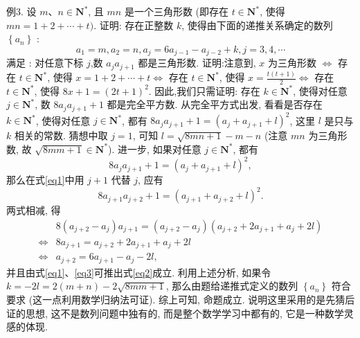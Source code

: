 例3. 设 $m 、 n \in \mathbf{N}^*$, 且 $m n$ 是一个三角形数 (即存在 $t \in \mathbf{N}^*$, 使得 $m n= 1+2+\cdots+t)$. 证明: 存在正整数 $k$, 使得由下面的递推关系确定的数列 $\left\{a_n\right\}$ :
$$
a_1=m, a_2=n, a_j=6 a_{j-1}-a_{j-2}+k, j=3,4, \cdots
$$
满足 : 对任意下标 $j$,数 $a_j a_{j+1}$ 都是三角形数.
证明:注意到,
$x$ 为三角形数 $\Leftrightarrow$ 存在 $t \in \mathbf{N}^*$, 使得 $x=1+2+\cdots+t\Leftrightarrow$ 存在 $t \in \mathbf{N}^*$, 使得 $x=\frac{t(t+1)}{2}\Leftrightarrow$ 存在 $t \in \mathbf{N}^*$, 使得 $8 x+1=(2 t+1)^2$.
因此,我们只需证明: 存在 $k \in \mathbf{N}^*$, 使得对任意 $j \in \mathbf{N}^*$, 数 $8 a_j a_{j+1}+1$ 都是完全平方数.
从完全平方式出发, 看看是否存在 $k \in \mathbf{N}^*$, 使得对任意 $j \in \mathbf{N}^*$, 都有 $8 a_j a_{j+1}+1=\left(a_j+a_{j+1}+l\right)^2$, 这里 $l$ 是只与 $k$ 相关的常数.
猜想中取 $j=1$, 可知 $l=\sqrt{8 m n+1}-m-n$ (注意 $m n$ 为三角形数, 故 $\sqrt{8 m m+1} \in \mathbf{N}^*$).
进一步, 如果对任意 $j \in \mathbf{N}^*$, 都有
$$
8 a_j a_{j+1}+1=\left(a_j+a_{j+1}+l\right)^2, \label{eq1}
$$
那么在式\ref{eq1}中用 $j+1$ 代替 $j$, 应有
$$
8 a_{j+1} a_{j+2}+1=\left(a_{j+1}+a_{j+2}+l\right)^2 . \label{eq2}
$$
两式相减, 得
$$
\begin{aligned}
& 8\left(a_{j+2}-a_j\right) a_{j+1}=\left(a_{j+2}-a_j\right)\left(a_{j+2}+2 a_{j+1}+a_j+2 l\right) \\
\Leftrightarrow & 8 a_{j+1}=a_{j+2}+2 a_{j+1}+a_j+2 l \\
\Leftrightarrow & a_{j+2}=6 a_{j+1}-a_j-2 l,
\end{aligned} \label{eq3}
$$
并且由式\ref{eq1}、\ref{eq3}可推出式\ref{eq2}成立.
利用上述分析, 如果令 $k=-2 l=2(m+n)-2 \sqrt{8 m m+1}$, 那么由题给递推式定义的数列 $\left\{a_n\right\}$ 符合要求 (这一点利用数学归纳法可证).
综上可知, 命题成立.
说明这里采用的是先猜后证的思想, 这不是数列问题中独有的, 而是整个数学学习中都有的, 它是一种数学灵感的体现.



